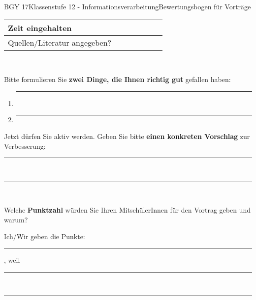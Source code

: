 \documentclass[oneside,openany,headings=optiontotoc,11pt,numbers=noenddot]{scrreprt}
\begin{document}
\begin{worksheet}{BGY 17}{Klassenstufe 12 - Informationsverarbeitung}{Bewertungsbogen für Vorträge}
\begin{tabularx}{\textwidth}{|l|M|M|M|M|M|M|}
			\hline
			Zeit eingehalten & & & & & \\
			\hline
			Quellen/Literatur angegeben? & & & & & \\
			\hline
		\end{tabularx}\\
		\par\bigskip\noindent
		Bitte formulieren Sie \textbf{zwei Dinge, die Ihnen richtig gut} gefallen haben:
		\begin{enumerate}
			\item \rule{0.93\textwidth}{0.1pt}\\
			\item \rule{0.93\textwidth}{0.1pt}
		\end{enumerate}
		\par\noindent
		Jetzt dürfen Sie aktiv werden. Geben Sie bitte \textbf{einen konkreten Vorschlag} zur Verbesserung:\\
		\par\noindent
		\rule{\textwidth}{0.1pt}\\
		\par\noindent
		\rule{\textwidth}{0.1pt}\\
		\par\noindent
		Welche \textbf{Punktzahl} würden Sie Ihren MitschülerInnen für den Vortrag geben und warum?\\
		\par\noindent
		Ich/Wir geben die Punkte: \rule{0.25\textwidth}{0.1pt}, weil \rule{0.45\textwidth}{0.1pt}\\
		\par\noindent
		\rule{\textwidth}{0.1pt}
	\end{worksheet}
\end{document}
